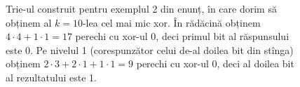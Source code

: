\begin{figure}[H]

  \caption{Trie-ul construit pentru exemplul 2 din enunț, în care dorim să obținem al $k=10$-lea cel mai mic xor. În rădăcină obținem $4 \cdot 4 + 1 \cdot 1 = 17$ perechi cu xor-ul 0, deci primul bit al răspunsului este 0. Pe nivelul 1 (corespunzător celui de-al doilea bit din stînga) obținem $2 \cdot 3 + 2 \cdot 1 + 1 \cdot 1 = 9$ perechi cu xor-ul 0, deci al doilea bit al rezultatului este 1.}
  \label{fig:trie-esoteric-bovines}
\end{figure}
